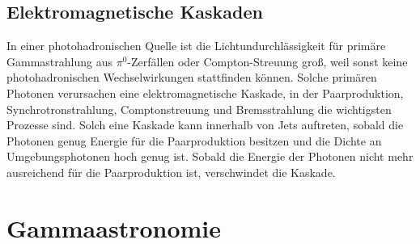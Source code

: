 
\subsection{Elektromagnetische Kaskaden}
In einer photohadronischen Quelle ist die Lichtundurchlässigkeit für primäre Gammastrahlung aus $\pi^0$-Zerfällen oder Compton-Streuung groß, weil sonst keine photohadronischen Wechselwirkungen stattfinden können.
Solche primären Photonen verursachen eine elektromagnetische Kaskade, in der Paarproduktion, Synchrotronstrahlung, Comptonstreuung und Bremsstrahlung die wichtigsten Prozesse sind.
Solch eine Kaskade kann innerhalb von Jets auftreten, sobald die Photonen genug Energie für die Paarproduktion besitzen und die Dichte an Umgebungsphotonen hoch genug ist.
Sobald die Energie der Photonen nicht mehr ausreichend für die Paarproduktion ist, verschwindet die Kaskade.\cite{RelativisticJets}


\section{Gammaastronomie}
\label{sec:Gammaastronomie}



